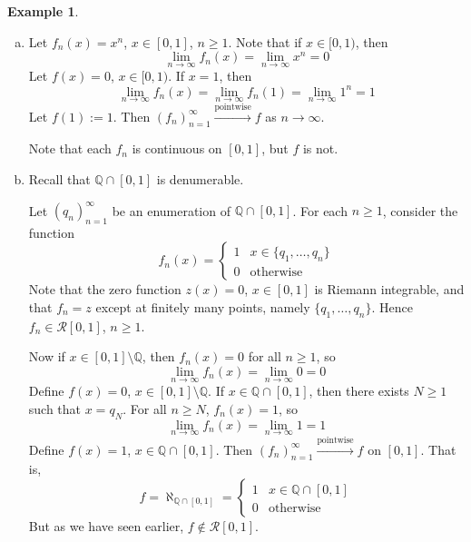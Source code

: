 \documentclass[11pt]{article}
\theoremstyle{definition}
\newtheorem{exmp}[thm]{Example}
\newcommand{\mbQ}{\ensuremath{\mathbb{Q}}}
\begin{document}
\begin{exmp}~
\begin{enumerate}[(a)]  \vspace{-0.2cm}

\item Let $f_n(x) = x^n$, $x \in [0, 1]$, $n \geq 1$. Note that if $x \in [0, 1)$, then
$$\lim_{n\to\infty} f_n(x) = \lim_{n\to\infty} x^n = 0$$
Let $f(x) = 0$, $x \in [0, 1)$. If $x = 1$, then
$$\lim_{n\to\infty} f_n(x) = \lim_{n\to\infty} f_n(1) = \lim_{n\to\infty} 1^n = 1$$
Let $f(1) := 1$. Then $(f_n)_{n=1}^\infty \xrightarrow{\text{pointwise}} f$ as $n \to \infty$. 

Note that each $f_n$ is continuous on $[0, 1]$, but $f$ is not. 

\item Recall that $\mbQ \cap [0, 1]$ is denumerable.

Let $(q_n)_{n=1}^\infty$ be an enumeration of $\mbQ \cap [0, 1]$. For each $n \geq 1$, consider the function
$$f_n(x) = \begin{cases} 1 & x \in \{q_1, \dots, q_n\} \\ 0 & \text{otherwise} \end{cases}$$
Note that the zero function $z(x) = 0$, $x \in [0, 1]$ is Riemann integrable, and that $f_n = z$ except at finitely many points, namely $\{q_1, \dots, q_n\}$. Hence $f_n \in \mathcal{R}[0, 1]$, $n \geq 1$.

Now if $x \in [0, 1] \setminus \mbQ$, then $f_n(x) = 0$ for all $n \geq 1$, so
$$\lim_{n\to\infty} f_n(x) = \lim_{n\to\infty} 0 = 0$$
Define $f(x) = 0$, $x \in [0, 1] \setminus \mbQ$. If $x \in \mbQ \cap [0, 1]$, then there exists $N \geq 1$ such that $x = q_N$. For all $n \geq N$, $f_n(x) = 1$, so
$$\lim_{n\to\infty} f_n(x) = \lim_{n\to\infty} 1 = 1$$
Define $f(x) = 1$, $x \in \mbQ \cap [0, 1]$. Then $(f_n)_{n=1}^\infty \xrightarrow{\text{pointwise}} f$ on $[0, 1]$. That is,
$$f = \aleph_{\mbQ \cap [0, 1]} = \begin{cases} 1 & x \in \mbQ \cap [0, 1] \\ 0 & \text{otherwise} \end{cases}$$
But as we have seen earlier, $f \notin \mathcal{R}[0, 1]$. 

\end{enumerate}
\end{exmp}
\end{document}
